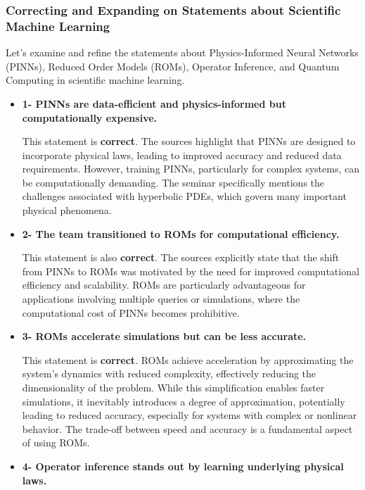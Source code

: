 \documentclass[
]{article}
\author{}
\date{}
\begin{document}
\subsubsection{Correcting and Expanding on Statements about Scientific
Machine
Learning}\label{correcting-and-expanding-on-statements-about-scientific-machine-learning}

Let's examine and refine the statements about Physics-Informed Neural
Networks (PINNs), Reduced Order Models (ROMs), Operator Inference, and
Quantum Computing in scientific machine learning.

\begin{itemize}
\item
  \textbf{1- PINNs are data-efficient and physics-informed but
  computationally expensive.}

  This statement is \textbf{correct}. The sources highlight that PINNs
  are designed to incorporate physical laws, leading to improved
  accuracy and reduced data requirements. However, training PINNs,
  particularly for complex systems, can be computationally demanding.
  The seminar specifically mentions the challenges associated with
  hyperbolic PDEs, which govern many important physical phenomena.
\item
  \textbf{2- The team transitioned to ROMs for computational
  efficiency.}

  This statement is also \textbf{correct}. The sources explicitly state
  that the shift from PINNs to ROMs was motivated by the need for
  improved computational efficiency and scalability. ROMs are
  particularly advantageous for applications involving multiple queries
  or simulations, where the computational cost of PINNs becomes
  prohibitive.
\item
  \textbf{3- ROMs accelerate simulations but can be less accurate.}

  This statement is \textbf{correct}. ROMs achieve acceleration by
  approximating the system's dynamics with reduced complexity,
  effectively reducing the dimensionality of the problem. While this
  simplification enables faster simulations, it inevitably introduces a
  degree of approximation, potentially leading to reduced accuracy,
  especially for systems with complex or nonlinear behavior. The
  trade-off between speed and accuracy is a fundamental aspect of using
  ROMs.
\item
  \textbf{4- Operator inference stands out by learning underlying
  physical laws.}


\end{itemize}
\end{document}
